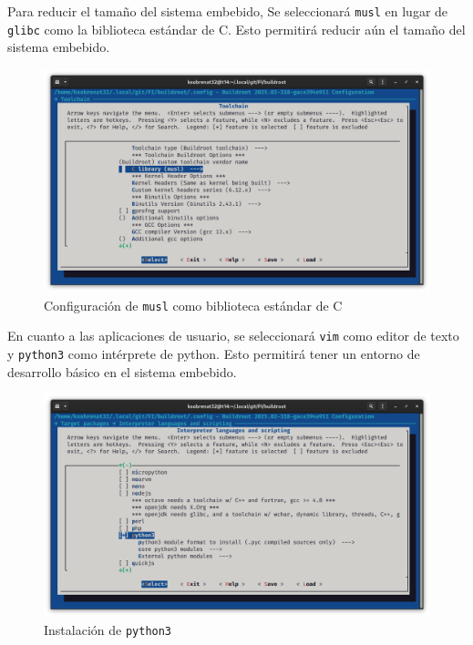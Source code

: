 \documentclass[12pt, letterpaper]{article}
\begin{document}
	Para reducir el tamaño del sistema embebido, Se seleccionará \texttt{musl} en lugar de \texttt{glibc} como la biblioteca estándar de C. Esto permitirá reducir aún el tamaño del sistema embebido.

	\begin{figure}[H]
		\centering
		\begin{center}
			\includegraphics[width=\textwidth]{img/make-menuconfig-02}
			\caption{Configuración de \texttt{musl} como biblioteca estándar de C}
			\label{fig:make-menuconfig-02}
		\end{center}
	\end{figure}

	En cuanto a las aplicaciones de usuario, se seleccionará \texttt{vim} como editor de texto y \texttt{python3} como intérprete de python. Esto permitirá tener un entorno de desarrollo básico en el sistema embebido.

	\begin{figure}[H]
		\centering
		\begin{center}
			\includegraphics[width=\textwidth]{img/make-menuconfig-03}
			\caption{Instalación de \texttt{python3}}
			\label{fig:make-menuconfig-03}
		\end{center}
	\end{figure}
\end{document}
